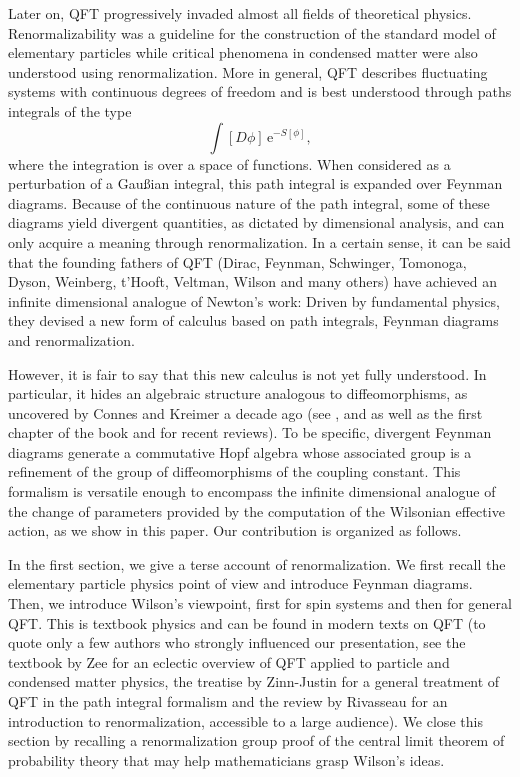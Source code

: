 \documentclass[10pt,here,feynmf]{article}
\begin{document}
Later on, QFT progressively invaded almost all fields of theoretical physics.  Renormalizability was a guideline for the construction of the standard model of elementary particles while critical phenomena in condensed matter were also understood using renormalization. More in general, QFT describes fluctuating systems with continuous degrees of freedom and is best understood through paths integrals of the type
\begin{equation}
\int[D\phi]\,\mathrm{e}^{-S[\phi]},
\end{equation}
where the integration is over a space of functions. When considered as a perturbation of a Gau\ss ian  integral, this path integral is expanded over Feynman diagrams. Because of the continuous nature of the path integral, some of these diagrams yield divergent quantities, as dictated by dimensional analysis, and can only acquire a meaning through renormalization. In a certain sense, it can be said that the founding fathers of QFT (Dirac, Feynman,  Schwinger, Tomonoga, Dyson, Weinberg, t'Hooft, Veltman, Wilson and many others) have achieved an infinite dimensional analogue of Newton's work: Driven by fundamental physics, they devised a new form of calculus based on path integrals, Feynman diagrams and renormalization.


However, it is fair to say that this new calculus is not yet fully understood. In particular, it hides an algebraic structure analogous to diffeomorphisms, as uncovered by Connes and Kreimer a decade ago (see \cite{ck0}, \cite{ck1} and \cite{ck2} as well as the first chapter of the book \cite{connesmarcolli} and \cite{kk} for recent reviews). To be specific, divergent Feynman diagrams generate a commutative Hopf algebra whose associated group is a refinement of the group of diffeomorphisms of the coupling constant. This formalism is versatile enough to encompass the infinite dimensional analogue of the change of parameters provided by the computation of the Wilsonian effective action, as we show in this paper. Our contribution is organized as follows.

In the first section, we give a terse account of renormalization. We first recall the elementary particle physics point of view and introduce Feynman diagrams. Then, we introduce Wilson's viewpoint, first for spin systems and then for general QFT. This is textbook physics and can be found in modern texts on QFT (to quote only a few authors who strongly influenced our presentation, see the textbook \cite{zee}  by Zee for an eclectic overview of QFT applied to particle and condensed matter physics, the treatise by Zinn-Justin \cite{zinn} for a general treatment of QFT in the path integral formalism  and the review by Rivasseau \cite{Rivasseau} for an introduction to renormalization, accessible to a large audience). We close this section by recalling a renormalization group proof of the central limit theorem of probability theory that may help mathematicians grasp Wilson's ideas.
\end{document}
